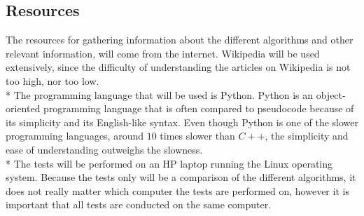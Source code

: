 \documentclass[main.tex]{subfiles}
\begin{document}
\subsection{Resources}
The resources for gathering information about the different algorithms and other relevant information, will come from the internet. Wikipedia will be used extensively, since the difficulty of understanding the articles on Wikipedia is not too high, nor too low.
\newline
\\*
The programming language that will be used is Python. Python is an object-oriented programming language that is often compared to pseudocode because of its simplicity and its English-like syntax. Even though Python is one of the slower programming languages, around $10$ times slower than $C++$, the simplicity and ease of understanding outweighs the slowness. 
\newline
\\*
The tests will be performed on an HP laptop running the Linux operating system. Because the tests only will be a comparison of the different algorithms, it does not really matter which computer the tests are performed on, however it is important that all tests are conducted on the same computer. 
\end{document}
